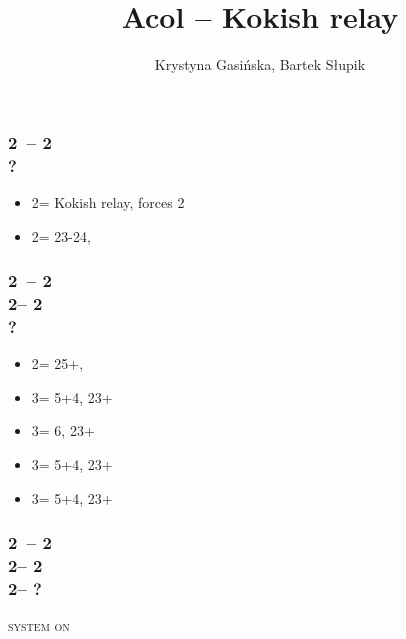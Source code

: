 \documentclass[12pt, a4paper]{article}
\title{Acol -- Kokish relay}
\author{Krystyna Gasińska, Bartek Słupik}
\begin{document}
\maketitle


\subsubsection*{2\clubs\ -- 2\diams \\ ?}
\begin{itemize}
    \item 2\hearts = Kokish relay, forces 2\spades
    \item 2\nt = 23-24, \bal
\end{itemize}

\subsubsection*{2\clubs\ -- 2\diams \\ 
                2\hearts -- 2\spades \\ ?}
\begin{itemize}
    \item 2\nt = 25+, \bal
    \item 3\clubs = 5\hearts+4\diams, 23+
    \item 3\diams = 6\hearts, 23+
    \item 3\hearts = 5\hearts+4\spades, 23+
    \item 3\spades = 5\hearts+4\clubs, 23+
\end{itemize}

\subsubsection*{2\clubs\ -- 2\diams \\ 
                2\hearts -- 2\spades \\
                2\nt -- ?}
\textsc{system on}

\end{document}
